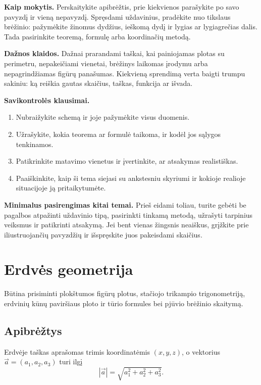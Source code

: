 \textbf{Kaip mokytis.} Perskaitykite apibrėžtis, prie kiekvienos parašykite po savo pavyzdį ir vieną nepavyzdį. Spręsdami uždavinius, pradėkite nuo tikslaus brėžinio: pažymėkite žinomus dydžius, ieškomą dydį ir lygias ar lygiagrečias dalis. Tada pasirinkite teoremą, formulę arba koordinačių metodą.

\textbf{Dažnos klaidos.} Dažnai prarandami taškai, kai painiojamas plotas su perimetru, nepakeičiami vienetai, brėžinys laikomas įrodymu arba nepagrindžiamas figūrų panašumas. Kiekvieną sprendimą verta baigti trumpu sakiniu: ką reiškia gautas skaičius, taškas, funkcija ar išvada.

\textbf{Savikontrolės klausimai.}
\begin{enumerate}[label=\arabic*.]
\item Nubraižykite schemą ir joje pažymėkite visus duomenis.
\item Užrašykite, kokia teorema ar formulė taikoma, ir kodėl jos sąlygos tenkinamos.
\item Patikrinkite matavimo vienetus ir įvertinkite, ar atsakymas realistiškas.
\item Paaiškinkite, kaip ši tema siejasi su ankstesniu skyriumi ir kokioje realioje situacijoje ją pritaikytumėte.
\end{enumerate}

\textbf{Minimalus pasirengimas kitai temai.} Prieš eidami toliau, turite gebėti be pagalbos atpažinti uždavinio tipą, pasirinkti tinkamą metodą, užrašyti tarpinius veiksmus ir patikrinti atsakymą. Jei bent vienas žingsnis neaiškus, grįžkite prie iliustruojančių pavyzdžių ir išspręskite juos pakeisdami skaičius.

\section{Erdvės geometrija}\label{sec:erdves-geometrija}

\begin{tcolorbox}[title=Prieš pradedant, colback=green!5]
Būtina prisiminti plokštumos figūrų plotus, stačiojo trikampio trigonometriją, erdvinių kūnų paviršiaus ploto ir tūrio formules bei pjūvio brėžinio skaitymą.
\end{tcolorbox}
\subsection{Apibrėžtys}

\begin{apibreztis}
Erdvėje taškas aprašomas trimis koordinatėmis $(x,y,z)$, o vektorius $\vec a=(a_1,a_2,a_3)$ turi ilgį
\[
|\vec a|=\sqrt{a_1^2+a_2^2+a_3^2}.
\]
\end{apibreztis}


